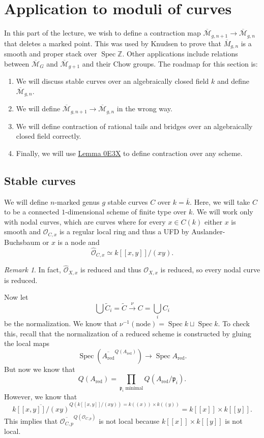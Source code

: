 \documentclass[leqno, openany]{memoir}
\theoremstyle{definition}
\theoremstyle{remark}
\newtheorem{rmk}[thm]{Remark}
\theoremstyle{plain}
\theoremstyle{definition}
\theoremstyle{remark}
\newcommand{\Z}{\mathbb{Z}}
\newcommand{\mc}[1]{\mathcal{#1}}
\newcommand{\mf}[1]{\mathfrak{#1}}
\newcommand{\mr}[1]{\mathrm{#1}}
\newcommand{\ol}[1]{\overline{#1}}
\newcommand{\wt}[1]{\widetilde{#1}}
\newcommand{\wh}[1]{\widehat{#1}}
\DeclareMathOperator{\Spec}{Spec}
\begin{document}
\section{Application to moduli of curves}%
\label{sec:application_to_moduli_of_curves}

In this part of the lecture, we wish to define a contraction map $\ol{\mc{M}}_{g, n+1} \to \ol{\mc{M}}_{g, n}$ that deletes a marked point. This was used by Knudsen to prove that $\ol{M}_{g, n}$ is a smooth and proper stack over $\Spec \Z$. Other applications include relations between $\ol{\mc{M}}_G$ and $\ol{\mc{M}}_{g+1}$ and their Chow groups. The roadmap for this section is:
\begin{enumerate}
    \item We will discuss stable curves over an algebraically closed field $k$ and define $\ol{\mc{M}}_{g, n}$.
    \item We will define $\ol{\mc{M}}_{g, n+1} \to \ol{\mc{M}}_{g, n}$ in the wrong way.
    \item We will define contraction of rational tails and bridges over an algebraically closed field correctly.
    \item Finally, we will use \href{https://stacks.math.columbia.edu/tag/0E3X}{Lemma 0E3X} to define contraction over any scheme.
\end{enumerate}

\subsection{Stable curves}%
\label{sub:stable_curves}

We will define $n$-marked genus $g$ stable curves $C$ over $k = \ol{k}$. Here, we will take $C$ to be a connected $1$-dimensional scheme of finite type over $k$. We will work only with nodal curves, which are curves where for every $x \in C(k)$ either $x$ is smooth and $\mc{O}_{C, x}$ is a regular local ring and thus a UFD by Auslander-Buchsbaum or $x$ is a node and
\[ \wh{\mc{O}}_{C, x} \simeq k [[x,y]]/(xy). \]

\begin{rmk}
    In fact, $\wh{\mc{O}}_{X,x}$ is reduced and thus $\mc{O}_{X,x}$ is reduced, so every nodal curve is reduced.
\end{rmk}

Now let 
\[ \bigcup \wt{C}_i = \wt{C} \xrightarrow{\nu} C = \bigcup_i C_i \] 
be the normalization. We know that $\nu^{-1}(\text{node}) = \Spec k \sqcup \Spec k$. To check this, recall that the normalization of a reduced scheme is constructed by gluing the local maps
\[ \Spec (\ol{A_{\mr{red}}}^{Q(A_{\mr{red}})}) \to \Spec A_{\mr{red}}. \]
But now we know that
\[ Q(A_{\mr{red}}) = \prod_{\mf{p}_i \text{ minimal}} Q(A_{\mr{red}}/\mf{p}_i). \]
However, we know that
\[ \ol{k[[x,y]]/(xy)}^{Q(k[[x,y]]/(xy)) = k((x)) \times k((y))} = k[[x]] \times k[[y]]. \]
This implies that $\ol{\mc{O}_{C,p}}^{Q(\mc{O}_{C,p})}$ is not local because $k[[x]] \times k[[y]]$ is not local.
\end{document}

